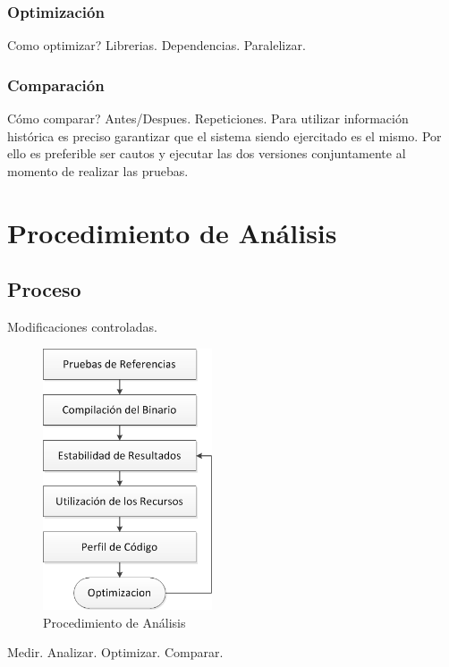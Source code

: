 \documentclass[a4paper]{report}
\begin{document}
\subsection{Optimizaci\'on}

Como optimizar? Librerias. Dependencias. Paralelizar.

\subsection{Comparaci\'on}

C\'omo comparar? Antes/Despues. Repeticiones. Para utilizar informaci\'on
hist\'orica es preciso garantizar que el sistema siendo ejercitado es el mismo. Por ello es preferible ser cautos y ejecutar las dos versiones conjuntamente
al momento de realizar las pruebas. 

\chapter{Procedimiento de An\'alisis}

\section{Proceso}

Modificaciones controladas.

\begin{figure}[H]
\label{fig:procedure}
\begin{center}
\includegraphics[width=5cm]{procedure.png}
\caption{Procedimiento de An\'alisis}
\end{center}
\end{figure}

\bigskip

Medir. Analizar. Optimizar. Comparar.
\end{document}
